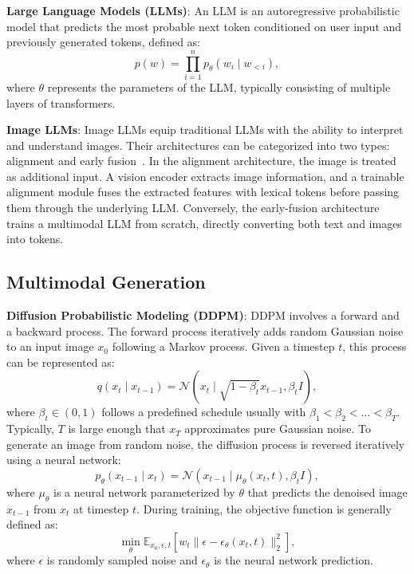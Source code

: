 \textbf{Large Language Models (LLMs)}: An LLM is an autoregressive probabilistic model that predicts
the most probable next token conditioned on user input and previously generated tokens, defined as:
\begin{equation}
    p(w) = \prod_{i=1}^{n} p_{\theta}(w_i \mid w_{<i}),
    \label{eq:llm-autoregressive}
\end{equation}
where $\theta$ represents the parameters of the LLM, typically consisting of multiple layers of transformers.

\textbf{Image LLMs}: Image LLMs equip traditional LLMs with the ability to interpret and understand images.
Their architectures can be categorized into two types: alignment and early fusion~\cite{chen2024multi}.
In the alignment architecture, the image is treated as additional input.
A vision encoder extracts image information, and a trainable alignment module fuses the extracted features
with lexical tokens before passing them through the underlying LLM. Conversely,
the early-fusion architecture trains a multimodal LLM from scratch, directly converting both text and images into tokens.

\subsection{Multimodal Generation}\label{subsec:multimodal-generation}

\textbf{Diffusion Probabilistic Modeling (DDPM)}: DDPM involves a forward and a backward process.
The forward process iteratively adds random Gaussian noise to an input image $x_0$ following a Markov process.
Given a timestep $t$, this process can be represented as:
\begin{equation}
    q(x_t \mid x_{t-1}) = \mathcal{N}(x_t \mid \sqrt{1 - \beta_t} x_{t-1}, \beta_t I),
    \label{eq:forward-ddpm}
\end{equation}
where $\beta_t \in (0,1)$ follows a predefined schedule usually with $\beta_1 < \beta_2 < \dots < \beta_T$.
Typically, $T$ is large enough that $x_T$ approximates pure Gaussian noise.
To generate an image from random noise, the diffusion process is reversed iteratively using a neural network:
\begin{equation}
    p_\theta(x_{t-1} \mid x_t) = \mathcal{N}(x_{t-1} \mid \mu_\theta(x_t, t), \beta_t I),
    \label{eq:reverse-ddpm}
\end{equation}
where $\mu_\theta$ is a neural network parameterized by $\theta$ that predicts
the denoised image $x_{t-1}$ from $x_t$ at timestep $t$.
During training, the objective function is generally defined as:
\begin{equation}
    \min_\theta \mathbb{E}_{x_0, \epsilon, t}[w_t \|\epsilon - \epsilon_\theta(x_t, t)\|_2^2],
    \label{eq:ddpm-loss}
\end{equation}
where $\epsilon$ is randomly sampled noise and $\epsilon_\theta$ is the neural network prediction.

